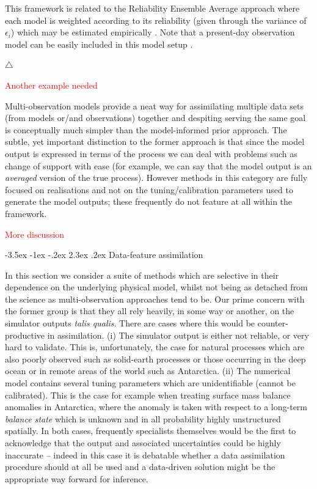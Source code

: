 \documentclass[10pt,a4paper]{article}
\makeatletter
\newcommand\xqed[1]{%
  \leavevmode\unskip\penalty9999 \hbox{}\nobreak\hfill
  \quad\hbox{#1}}
\newcommand\demo{\xqed{$\triangle$}}
\newcommand{\red}{\textcolor{red}}
\renewcommand\section{\@startsection{section}{1}{\z@}%
                                  {-3.5ex \@plus -1ex \@minus -.2ex}%
                                  {2.3ex \@plus.2ex}%
                                  {\normalfont\large\bfseries}}
\makeatother
\begin{document}
\noindent This framework is related to the Reliability Ensemble Average approach where each model is weighted according to its reliability (given through the variance of $\epsilon_i$) which may be estimated empirically \citep{Giorgi_2002}. Note that a present-day observation model can be easily included in this model setup \citep[see also][]{Smith_2009,Tebaldi_2007}. 

\demo


\red{Another example needed}

Multi-observation models provide a neat way for assimilating multiple data sets (from models or/and observations) together and despiting serving the same goal is conceptually much simpler than the model-informed prior approach. The subtle, yet important distinction to the former approach is that since the model output is expressed in terms of the process we can deal with problems such as change of support with ease (for example, we can say that the model output is an \emph{averaged} version of the true process). However methods in this category are fully focused on realisations and not on the tuning/calibration parameters used to generate the model outputs; these frequently do not feature at all within the framework.  

\red{More discussion}


\section{Data-feature assimilation}

In this section we consider a suite of methods which are selective in their dependence on the underlying physical model, whilst not being as detached from the science as multi-observation approaches tend to be. Our prime concern with the former group is that they all rely heavily, in some way or another, on the simulator outputs \emph{talis qualis}. There are cases where this would be counter-productive in assimilation. (i) The simulator output is either not reliable, or very hard to validate. This is, unfortunately, the case for natural processes which are also poorly observed such as solid-earth processes or those occurring in the deep ocean or in remote areas of the world such as Antarctica. (ii) The numerical model contains several tuning parameters which are unidentifiable (cannot be calibrated). This is the case for example when treating surface mass balance anomalies in Antarctica, where the anomaly is taken with respect to a long-term \emph{balance state} which is unknown and in all probability highly unstructured spatially. In both cases, frequently specialists themselves would be the first to acknowledge that the output and associated uncertainties could be highly inaccurate -- indeed in this case it is debatable whether a data assimilation procedure should at all be used and a data-driven solution might be the appropriate way forward for inference. 
\end{document}
